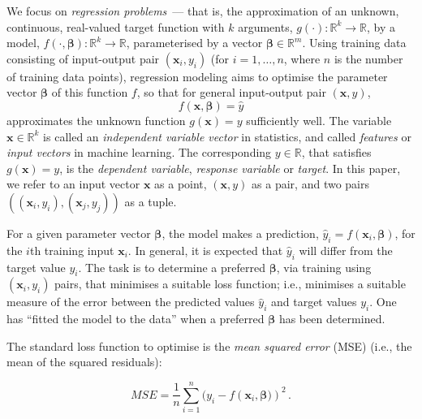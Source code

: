 \documentclass{article}
\begin{document}
We focus on \emph{regression problems}~--- that is, the approximation of an unknown, continuous, real-valued target function with $k$ arguments, $g(\cdot):{\mathbb R}^{k}\to{\mathbb R}$, by a model, $f(\cdot,\boldsymbol{\beta}):{\mathbb R}^{k}\to{\mathbb R}$, parameterised by a vector $\boldsymbol{\beta}\in{\mathbb R}^m$. 
Using training data consisting of input-output pair $(\mathbf{x}_i,y_i)$ (for $i=1,\ldots,n$, where $n$ is the number of training data points), regression modeling aims to optimise the parameter vector $\boldsymbol{\beta}$ of this function $f$, so that for general input-output pair $(\mathbf{x},y)$, 
\begin{equation}
 f(\mathbf{x},\boldsymbol{\beta}) = \hat{y}
\end{equation}
approximates the unknown function $g(\mathbf{x})=y$ sufficiently well. 
The variable $\mathbf{x}\in\mathbb{R}^k$ is called an 
\textit{independent variable vector} in statistics, and called \textit{features} or \textit{input vectors} in machine learning. The corresponding $y \in \mathbb{R}$, that satisfies $g(\mathbf{x})=y$, is the \textit{dependent variable}, \textit{response variable} or \textit{target}.
In this paper, we refer to an input vector $\mathbf{x}$ as a point, $(\mathbf{x},y)$ as a pair, and two pairs $((\mathbf{x}_i,y_i),(\mathbf{x}_j,y_j))$ as a tuple.


For a given parameter vector $\boldsymbol{\beta}$, the model makes a prediction, $\hat{y}_i = f(\mathbf{x}_i,\boldsymbol{\beta})$, for the $i$th training input $\mathbf{x}_i$.
In general, it is expected that $\hat{y}_i$ will differ from the target value $y_i$. The task is to determine a preferred $\boldsymbol{\beta}$, via training using $(\mathbf{x}_i,y_i)$ pairs, that minimises a suitable loss function; i.e., minimises a suitable measure of the error between the predicted values $\hat{y}_i$ and target values $y_i$. 
One has ``fitted the model to the data'' when a preferred $\boldsymbol \beta$ has been determined.

The standard loss function to optimise is the \emph{mean squared error} (MSE) (i.e., the mean of the squared residuals):

\begin{equation}
 MSE = \frac{1}{n}\sum_{i=1}^n (y_i - f(\mathbf{x}_i,\boldsymbol{\beta)})^2\,.
\end{equation}
\end{document}
